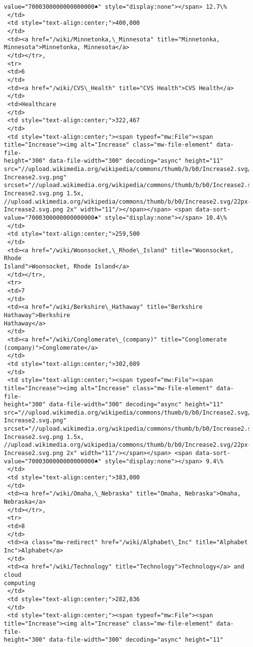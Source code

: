 \documentclass[11pt]{article}
\begin{document}
\begin{tcolorbox}[breakable, size=fbox, boxrule=.5pt, pad at break*=1mm, opacityfill=0]
\begin{Verbatim}[commandchars=\\\{\}]
value="7000300000000000000♠" style="display:none"></span> 12.7\%
 </td>
 <td style="text-align:center;">400,000
 </td>
 <td><a href="/wiki/Minnetonka,\_Minnesota" title="Minnetonka,
Minnesota">Minnetonka, Minnesota</a>
 </td></tr>,
 <tr>
 <td>6
 </td>
 <td><a href="/wiki/CVS\_Health" title="CVS Health">CVS Health</a>
 </td>
 <td>Healthcare
 </td>
 <td style="text-align:center;">322,467
 </td>
 <td style="text-align:center;"><span typeof="mw:File"><span
title="Increase"><img alt="Increase" class="mw-file-element" data-file-
height="300" data-file-width="300" decoding="async" height="11"
src="//upload.wikimedia.org/wikipedia/commons/thumb/b/b0/Increase2.svg/11px-
Increase2.svg.png"
srcset="//upload.wikimedia.org/wikipedia/commons/thumb/b/b0/Increase2.svg/17px-
Increase2.svg.png 1.5x,
//upload.wikimedia.org/wikipedia/commons/thumb/b/b0/Increase2.svg/22px-
Increase2.svg.png 2x" width="11"/></span></span> <span data-sort-
value="7000300000000000000♠" style="display:none"></span> 10.4\%
 </td>
 <td style="text-align:center;">259,500
 </td>
 <td><a href="/wiki/Woonsocket,\_Rhode\_Island" title="Woonsocket, Rhode
Island">Woonsocket, Rhode Island</a>
 </td></tr>,
 <tr>
 <td>7
 </td>
 <td><a href="/wiki/Berkshire\_Hathaway" title="Berkshire Hathaway">Berkshire
Hathaway</a>
 </td>
 <td><a href="/wiki/Conglomerate\_(company)" title="Conglomerate
(company)">Conglomerate</a>
 </td>
 <td style="text-align:center;">302,089
 </td>
 <td style="text-align:center;"><span typeof="mw:File"><span
title="Increase"><img alt="Increase" class="mw-file-element" data-file-
height="300" data-file-width="300" decoding="async" height="11"
src="//upload.wikimedia.org/wikipedia/commons/thumb/b/b0/Increase2.svg/11px-
Increase2.svg.png"
srcset="//upload.wikimedia.org/wikipedia/commons/thumb/b/b0/Increase2.svg/17px-
Increase2.svg.png 1.5x,
//upload.wikimedia.org/wikipedia/commons/thumb/b/b0/Increase2.svg/22px-
Increase2.svg.png 2x" width="11"/></span></span> <span data-sort-
value="7000300000000000000♠" style="display:none"></span> 9.4\%
 </td>
 <td style="text-align:center;">383,000
 </td>
 <td><a href="/wiki/Omaha,\_Nebraska" title="Omaha, Nebraska">Omaha, Nebraska</a>
 </td></tr>,
 <tr>
 <td>8
 </td>
 <td><a class="mw-redirect" href="/wiki/Alphabet\_Inc" title="Alphabet
Inc">Alphabet</a>
 </td>
 <td><a href="/wiki/Technology" title="Technology">Technology</a> and cloud
computing
 </td>
 <td style="text-align:center;">282,836
 </td>
 <td style="text-align:center;"><span typeof="mw:File"><span
title="Increase"><img alt="Increase" class="mw-file-element" data-file-
height="300" data-file-width="300" decoding="async" height="11"

\end{Verbatim}
\end{tcolorbox}
\end{document}

